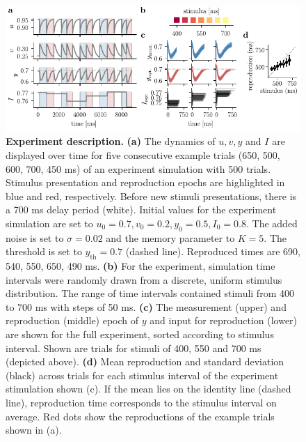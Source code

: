 \documentclass[10pt]{article}
\begin{document}
\begin{figure}[ht]
	\centering
	\includegraphics{figures/trial.pdf}
	\caption{\textbf{Experiment description.} 
	\textbf{(a)} The dynamics of $u, v, y $ and $I$ are displayed over time for five consecutive example trials (650, 500, 600, 700, 450 ms) of an experiment simulation with 500 trials. Stimulus presentation and reproduction epochs are highlighted in blue and red, respectively. Before new stimuli presentations, there is a 700 ms delay period (white). Initial values for the experiment simulation are set to $u_0=0.7, v_0=0.2, y_0=0.5, I_0=0.8$. The added noise is set to $\sigma=0.02$ and the memory parameter to $K=5$. The threshold is set to $y_{\text{th}}=0.7$ (dashed line). Reproduced times are 690, 540, 550, 650, 490 ms.
	\textbf{(b)} For the experiment, simulation time intervals were randomly drawn from a discrete, uniform stimulus distribution. The range of time intervals contained stimuli from 400 to 700 ms with steps of 50 ms.
	\textbf{(c)} The measurement (upper) and reproduction (middle) epoch of $y$ and input for reproduction (lower) are shown for the full experiment, sorted according to stimulus interval. Shown are trials for stimuli of 400, 550 and 700 ms (depicted above).
	\textbf{(d)} Mean reproduction and standard deviation (black) across trials for each stimulus interval of the experiment stimulation shown (c). If the mean lies on the identity line (dashed line), reproduction time corresponds to the stimulus interval on average. Red dots show the reproductions of the example trials shown in (a). 
	}
\label{fig:experiment}
\end{figure}
\end{document}
